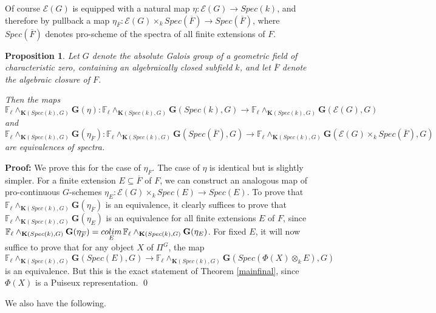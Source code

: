 \documentclass[11pt]{article}
\newcommand\mb{\mathbb}
\newcommand\mc{\mathcal}
\def \bK{\mathbf K}
\newcommand\mfk{\mathbf G}
\newtheorem{Proposition}{Proposition}[section]
\newenvironment{Proof}{\par\noindent\textbf{Proof:}}
{\qed}
\begin{document}
 Of course $\mc{E}(G)$ is equipped with a natural map $\eta: {\mc{E}(G) }\rightarrow Spec(k)$, and therefore by pullback  a map $\eta _{\overline{F}}:  {\mc{E}(G) }\times _k Spec(\overline{F}) \rightarrow  Spec(\overline{F})  $, where $Spec(\overline{F})$ denotes pro-scheme of the spectra of  all finite extensions of $F$.     
\begin{Proposition}\label{assemblecolim}
Let $G$ denote the absolute Galois group of a geometric field of characteristic zero, containing an algebraically closed subfield $k$, and let $\overline F$ denote the algebraic closure of $F$.  
    
    Then the maps
$$ \mb{F}_{\ell} \wedge _{\bK(Spec(k),G)}\mfk(\eta ): \mb{F}_{\ell} \wedge _{\bK(Spec(k),G)}\mfk(Spec(k), G) \rightarrow  \mb{F}_{\ell} \wedge _{\bK(Spec(k),G)}\mfk({\mc{E}(G) } , G) 
   $$
   and 
   $$ \mb{F}_{\ell} \wedge _{\bK(Spec(k),G)}\mfk(\eta _{\overline{F}}): \mb{F}_{\ell} \wedge _{\bK(Spec(k),G)}\mfk(Spec(\overline{F} ), G) \rightarrow  \mb{F}_{\ell} \wedge _{\bK(Spec(k),G)}\mfk({\mc{E}(G) } \times _k Spec(\overline{F}), G) 
   $$
  are equivalences  of spectra. 
\end{Proposition}
\begin{Proof} 
We prove this for the case of $\eta _{\overline{F}}$. The case of $\eta$ is identical but is slightly simpler.  For a finite extension $E \subseteq \overline{F}$ of $F$, we can construct an analogous map of pro-continuous $G$-schemes $\eta _{E} : {\mc{E}(G)} \times _k Spec(E) \rightarrow Spec(E) $.  To prove that $\mb{F}_{\ell} \wedge _{\bK(Spec(k),G)}\mfk(\eta _{\overline{F}})$ is an equivalence, it clearly suffices to prove that $\mb{F}_{\ell} \wedge _{\bK(Spec(k),G)}\mfk(\eta _{E})$ is an equivalence for all finite extensions $E$ of $F$, since $\mb{F}_{\ell} \wedge _{\bK(Spec(k),G)}\mfk(\eta _{\overline{F}}) = \underset{E}{colim}\hspace{.05cm}\mb{F}_{\ell} \wedge _{\bK(Spec(k),G)}\mfk(\eta _{E})$. For fixed $E$, it will now suffice to prove that for any object $X$ of $\Pi ^G$, the map 
$$ \mb{F}_{\ell} \wedge _{\bK(Spec(k),G)}\mfk(Spec(E), G) \rightarrow  \mb{F}_{\ell} \wedge _{\bK(Spec(k),G)} \mfk(Spec(\Phi (X) \otimes _k E), G) 
$$
is an equivalence.  But this is the exact statement of Theorem \ref{mainfinal}, since $\Phi (X)$ is a Puiseux representation.   
\end{Proof} 

We also have the following. 
\end{document}
